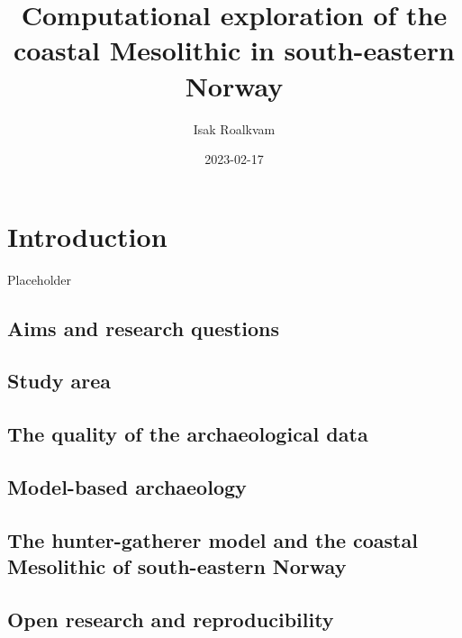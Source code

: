 \documentclass[
  oneside]{book}
\title{Computational exploration of the coastal Mesolithic in south-eastern Norway}
\author{Isak Roalkvam}
\date{2023-02-17}
\begin{document}
\maketitle

{
\setcounter{tocdepth}{1}
\tableofcontents
}
\hypertarget{introduction}{%
\chapter{Introduction}\label{introduction}}

Placeholder

\hypertarget{aims-and-research-questions}{%
\section{Aims and research questions}\label{aims-and-research-questions}}

\hypertarget{study-area}{%
\section{Study area}\label{study-area}}

\hypertarget{the-quality-of-the-archaeological-data}{%
\section{The quality of the archaeological data}\label{the-quality-of-the-archaeological-data}}

\hypertarget{model-based-archaeology}{%
\section{Model-based archaeology}\label{model-based-archaeology}}

\hypertarget{the-hunter-gatherer-model-and-the-coastal-mesolithic-of-south-eastern-norway}{%
\section{The hunter-gatherer model and the coastal Mesolithic of south-eastern Norway}\label{the-hunter-gatherer-model-and-the-coastal-mesolithic-of-south-eastern-norway}}

\hypertarget{open-research-and-reproducibility}{%
\section{Open research and reproducibility}\label{open-research-and-reproducibility}}
\end{document}
